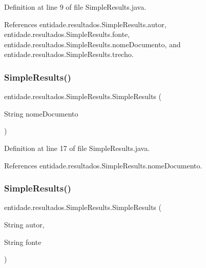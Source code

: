 Definition at line 9 of file Simple\+Results.\+java.



References entidade.\+resultados.\+Simple\+Results.\+autor, entidade.\+resultados.\+Simple\+Results.\+fonte, entidade.\+resultados.\+Simple\+Results.\+nome\+Documento, and entidade.\+resultados.\+Simple\+Results.\+trecho.

\hypertarget{classentidade_1_1resultados_1_1SimpleResults_a4096968b8553b2b79984846a6f51603d}{}\label{classentidade_1_1resultados_1_1SimpleResults_a4096968b8553b2b79984846a6f51603d} 
\subsubsection{\texorpdfstring{Simple\+Results()}{SimpleResults()}\hspace{0.1cm}{\footnotesize\ttfamily [2/3]}}
{\footnotesize\ttfamily entidade.\+resultados.\+Simple\+Results.\+Simple\+Results (\begin{DoxyParamCaption}\item[{String}]{nome\+Documento }\end{DoxyParamCaption})}



Definition at line 17 of file Simple\+Results.\+java.



References entidade.\+resultados.\+Simple\+Results.\+nome\+Documento.

\hypertarget{classentidade_1_1resultados_1_1SimpleResults_a812be57a6cbdee87ce754241eeae9bc0}{}\label{classentidade_1_1resultados_1_1SimpleResults_a812be57a6cbdee87ce754241eeae9bc0} 
\subsubsection{\texorpdfstring{Simple\+Results()}{SimpleResults()}\hspace{0.1cm}{\footnotesize\ttfamily [3/3]}}
{\footnotesize\ttfamily entidade.\+resultados.\+Simple\+Results.\+Simple\+Results (\begin{DoxyParamCaption}\item[{String}]{autor,  }\item[{String}]{fonte }\end{DoxyParamCaption})}



